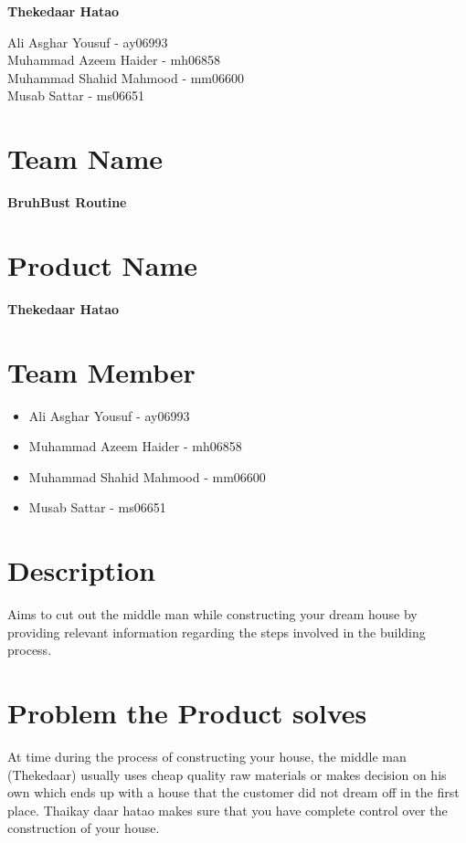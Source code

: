 \documentclass{article}
\begin{document}

\setcounter{page}{1}
\begin{center}
    \textbf{\large{
            Thekedaar Hatao}}
\end{center}
\large{
    Ali Asghar Yousuf - ay06993\\
    Muhammad Azeem Haider - mh06858\\
    Muhammad Shahid Mahmood - mm06600\\
    Musab Sattar - ms06651}
{} %

\section{Team Name}
\textbf{BruhBust Routine}

\section{Product Name}
\textbf{Thekedaar Hatao}

\section{Team Member}
\begin{itemize}
    \item Ali Asghar Yousuf - ay06993
    \item Muhammad Azeem Haider - mh06858
    \item Muhammad Shahid Mahmood - mm06600
    \item Musab Sattar - ms06651
\end{itemize}

\section{Description}
Aims to cut out the middle man while constructing your dream house by providing
relevant information regarding the steps involved in the building process.

\section{Problem the Product solves}
At time during the process of constructing your house, the middle man (Thekedaar) usually uses cheap quality raw materials or makes decision on his own
which ends up with a house that the customer did not dream off in the first
place. Thaikay daar hatao makes sure that you have complete control over the
construction of your house.
\end{document}
